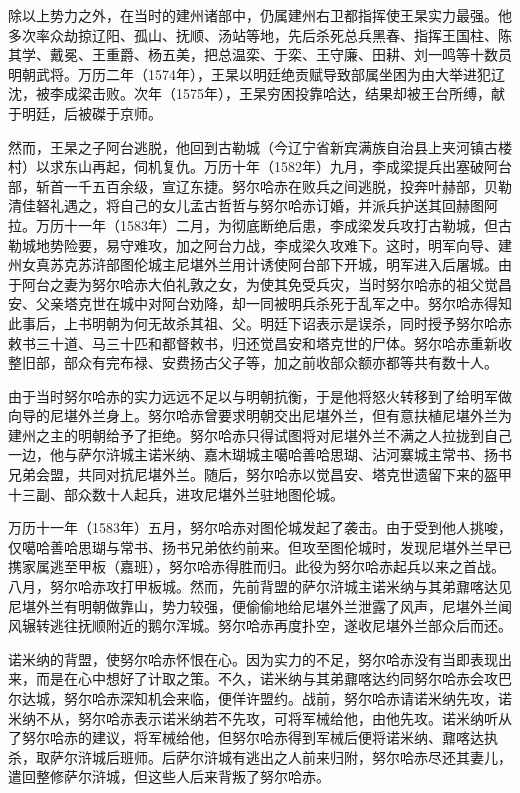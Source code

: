 除以上势力之外，在当时的建州诸部中，仍属建州右卫都指挥使王杲实力最强。他多次率众劫掠辽阳、孤山、抚顺、汤站等地，先后杀死总兵黑春、指挥王国柱、陈其学、戴冕、王重爵、杨五美，把总温栾、于栾、王守廉、田耕、刘一鸣等十数员明朝武将。万历二年（1574年），王杲以明廷绝贡赋导致部属坐困为由大举进犯辽沈，被李成梁击败。次年（1575年），王杲穷困投靠哈达，结果却被王台所缚，献于明廷，后被磔于京师。

然而，王杲之子阿台逃脱，他回到古勒城（今辽宁省新宾满族自治县上夹河镇古楼村）以求东山再起，伺机复仇。万历十年（1582年）九月，李成梁提兵出塞破阿台部，斩首一千五百余级，宣辽东捷。努尔哈赤在败兵之间逃脱，投奔叶赫部，贝勒清佳砮礼遇之，将自己的女儿孟古哲哲与努尔哈赤订婚，并派兵护送其回赫图阿拉。万历十一年（1583年）二月，为彻底断绝后患，李成梁发兵攻打古勒城，但古勒城地势险要，易守难攻，加之阿台力战，李成梁久攻难下。这时，明军向导、建州女真苏克苏浒部图伦城主尼堪外兰用计诱使阿台部下开城，明军进入后屠城。由于阿台之妻为努尔哈赤大伯礼敦之女，为使其免受兵灾，当时努尔哈赤的祖父觉昌安、父亲塔克世在城中对阿台劝降，却一同被明兵杀死于乱军之中。努尔哈赤得知此事后，上书明朝为何无故杀其祖、父。明廷下诏表示是误杀，同时授予努尔哈赤敕书三十道、马三十匹和都督敕书，归还觉昌安和塔克世的尸体。努尔哈赤重新收整旧部，部众有完布禄、安费扬古父子等，加之前收部众额亦都等共有数十人。

由于当时努尔哈赤的实力远远不足以与明朝抗衡，于是他将怒火转移到了给明军做向导的尼堪外兰身上。努尔哈赤曾要求明朝交出尼堪外兰，但有意扶植尼堪外兰为建州之主的明朝给予了拒绝。努尔哈赤只得试图将对尼堪外兰不满之人拉拢到自己一边，他与萨尔浒城主诺米纳、嘉木瑚城主噶哈善哈思瑚、沾河寨城主常书、扬书兄弟会盟，共同对抗尼堪外兰。随后，努尔哈赤以觉昌安、塔克世遗留下来的盔甲十三副、部众数十人起兵，进攻尼堪外兰驻地图伦城。

万历十一年（1583年）五月，努尔哈赤对图伦城发起了袭击。由于受到他人挑唆，仅噶哈善哈思瑚与常书、扬书兄弟依约前来。但攻至图伦城时，发现尼堪外兰早已携家属逃至甲板（嘉班），努尔哈赤得胜而归。此役为努尔哈赤起兵以来之首战。八月，努尔哈赤攻打甲板城。然而，先前背盟的萨尔浒城主诺米纳与其弟鼐喀达见尼堪外兰有明朝做靠山，势力较强，便偷偷地给尼堪外兰泄露了风声，尼堪外兰闻风辗转逃往抚顺附近的鹅尔浑城。努尔哈赤再度扑空，遂收尼堪外兰部众后而还。

诺米纳的背盟，使努尔哈赤怀恨在心。因为实力的不足，努尔哈赤没有当即表现出来，而是在心中想好了计取之策。不久，诺米纳与其弟鼐喀达约同努尔哈赤会攻巴尔达城，努尔哈赤深知机会来临，便佯许盟约。战前，努尔哈赤请诺米纳先攻，诺米纳不从，努尔哈赤表示诺米纳若不先攻，可将军械给他，由他先攻。诺米纳听从了努尔哈赤的建议，将军械给他，但努尔哈赤得到军械后便将诺米纳、鼐喀达执杀，取萨尔浒城后班师。后萨尔浒城有逃出之人前来归附，努尔哈赤尽还其妻儿，遣回整修萨尔浒城，但这些人后来背叛了努尔哈赤。

